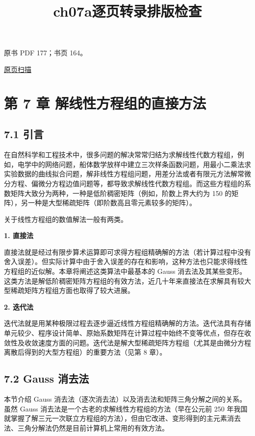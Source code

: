 \documentclass[
  10pt,
  fontset=fandol]{ctexart}
\title{ch07a逐页转录排版检查}
\author{}
\date{}
\begin{document}
\maketitle

\clearpage

原书 PDF 177；书页 164。

\href{../../../source-images/pdf-177.jpeg}{原页扫描}

\section{第 7 章 解线性方程组的直接方法}\label{ux7b2c-7-ux7ae0-ux89e3ux7ebfux6027ux65b9ux7a0bux7ec4ux7684ux76f4ux63a5ux65b9ux6cd5}

\subsection{7.1 引言}\label{ux5f15ux8a00}

在自然科学和工程技术中，很多问题的解决常常归结为求解线性代数方程组，例如，电学中的网络问题，船体数学放样中建立三次样条函数问题，用最小二乘法求实验数据的曲线拟合问题，解非线性方程组问题，用差分法或者有限元方法解常微分方程、偏微分方程边值问题等，都导致求解线性代数方程组。而这些方程组的系数矩阵大致分为两种，一种是低阶稠密矩阵（例如，阶数上界大约为 150 的矩阵），另一种是大型稀疏矩阵（即阶数高且零元素较多的矩阵）。

关于线性方程组的数值解法一般有两类。

\textbf{1. 直接法}

直接法就是经过有限步算术运算即可求得方程组精确解的方法（若计算过程中没有舍入误差）。但实际计算中由于舍入误差的存在和影响，这种方法也只能求得线性方程组的近似解。本章将阐述这类算法中最基本的 Gauss 消去法及其某些变形。这类方法是解低阶稠密矩阵方程组的有效方法，近几十年来直接法在求解具有较大型稀疏矩阵方程组方面也取得了较大进展。

\textbf{2. 迭代法}

迭代法就是用某种极限过程去逐步逼近线性方程组精确解的方法。迭代法具有存储单元较少、程序设计简单、原始系数矩阵在计算过程中始终不变等优点，但存在收敛性及收敛速度方面的问题。迭代法是解大型稀疏矩阵方程组（尤其是由微分方程离散后得到的大型方程组）的重要方法（见第 8 章）。

\subsection{7.2 Gauss 消去法}\label{gauss-ux6d88ux53bbux6cd5}

本节介绍 Gauss 消去法（逐次消去法）以及消去法和矩阵三角分解之间的关系。虽然 Gauss 消去法是一个古老的求解线性方程组的方法（早在公元前 250 年我国就掌握了解三元一次联立方程组的方法），但由它改进、变形得到的主元素消去法、三角分解法仍然是目前计算机上常用的有效方法。
\end{document}
